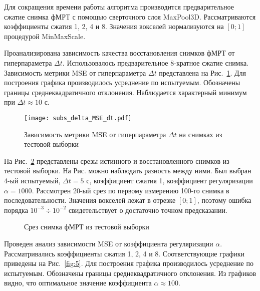 \documentclass[a4paper, 12pt]{article}
\begin{document}
	Для сокращения времени работы алгоритма производится предварительное сжатие снимка фМРТ
	с помощью сверточного слоя MaxPool3D. Рассматриваются коэффициенты сжатия 1, 2, 4 и 8.
	Значения вокселей нормализуются на $[0; 1]$ процедурой MinMaxScale.

	Проанализирована зависимость качества восстановления снимков фМРТ от гиперпараметра $\Delta t$.
	Использовалось предварительное 8-кратное сжатие снимка.
	Зависимость метрики MSE от гиперпараметра $\Delta t$ представлена на Рис.~\ref{fig:mse-dt}.
	Для построения графика производилось усреднение по испытуемым.
	Обозначены границы среднеквадратичного отклонения. 
	Наблюдается характерный минимум при $\Delta t \approx 10 \text{ с}$.
	
	\begin{figure}[h!]
		\centering
		\texttt{[image: subs\_delta\_MSE\_dt.pdf]}
		\caption{Зависимость метрики MSE от гиперпараметра $\Delta t$ на снимках из тестовой выборки}
		\label{fig:mse-dt}
	\end{figure}
	
	На Рис.~\ref*{fig:4} представлены срезы истинного и восстановленного снимков из 
	тестовой выборки. На Рис. можно наблюдать разность между ними.
	Был выбран 4-ый испытуемый, $\Delta t = 5 \text{ с}$, коэффициент сжатия 1, коэффициент регуляризации
	$\alpha = 1000$. Рассмотрен 20-ый срез по первому измерению 100-го снимка в последовательности.
	Значения вокселей лежат в отрезке $[0; 1]$, поэтому ошибка порядка $10^{-3} \div 10^{-2}$
	свидетельствует о достаточно точном предсказании.

	\begin{figure}[h!]
		\centering
		\hfill
		\hfill
		\caption{Срез снимка фМРТ из тестовой выборки}
		\label{fig:4}
	\end{figure}

	Проведен анализ зависимости MSE от коэффициента регуляризации $\alpha$.
	Рассматривались коэффициенты сжатия 1, 2, 4 и 8. 
	Соответствующие графики приведены на Рис.~\ref{fig:5}.
	Для построения графика производилось усреднение по испытуемым.
	Обозначены границы среднеквадратичного отклонения.
	Из графиков видно, что оптимальное значение коэффициента $\alpha \approx 100$.
\end{document}
